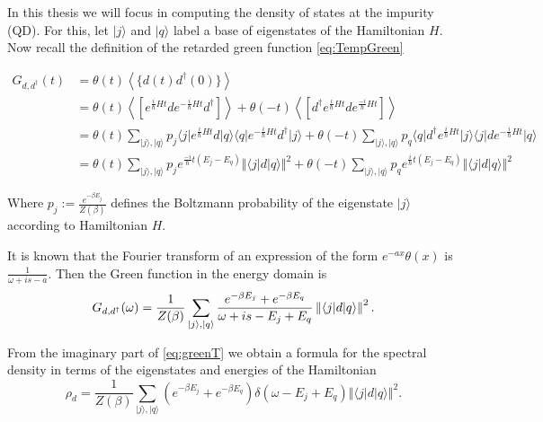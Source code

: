 
In this thesis we will focus in computing the density of states at the impurity (QD). For this, let $\vert j\rangle$ and $\vert q \rangle$ label a base of eigenstates of the Hamiltonian $H$. Now recall the definition of the retarded green function \eqref{eq:TempGreen}

\begin{align}
G_{d,d^{\dagger}}(t)&=\theta(t)\left\langle \{ d(t)d^{\dagger}(0) \} \right\rangle \\ \label{eq:MeanGreen}
&=\theta(t)\left\langle \left[e^{\frac{i}{\hbar}Ht}de^{-\frac{i}{\hbar}Ht}d^{\dagger}\right]\right\rangle +\theta(-t)\left\langle \left[d^{\dagger}e^{\frac{i}{\hbar}Ht}de^{\frac{-i}{\hbar}Ht}\right]\right\rangle \\
&=\theta(t)\sum_{\vert j\rangle,\vert q\rangle}p_{j}\langle j\vert e^{\frac{i}{\hbar}Ht}d\vert q\rangle\langle q\vert e^{-\frac{i}{\hbar}Ht}d^{\dagger}\vert j\rangle+\theta(-t)\sum_{\vert j\rangle,\vert q\rangle}p_{q}\langle q\vert d^{\dagger}e^{\frac{i}{\hbar}Ht}\vert j\rangle\langle j\vert de^{-\frac{i}{\hbar}Ht}\vert q\rangle\\
&=\theta(t)\sum_{\vert j\rangle,\vert q\rangle}p_{j}e^{\frac{-i}{\hbar}t\left(E_{j}-E_{q}\right)}\left\Vert \langle j\vert d\vert q\rangle\right\Vert ^{2}+\theta(-t)\sum_{\vert j\rangle,\vert q\rangle}p_{q}e^{\frac{i}{\hbar}t\left(E_{j}-E_{q}\right)}\left\Vert \langle j\vert d\vert q\rangle\right\Vert ^{2}
\end{align}

\noindent Where $p_{j}:=\frac{e^{-\beta E_{j}}}{Z(\beta)}$ defines the Boltzmann probability of the eigenstate $\vert j\rangle$ according to Hamiltonian $H$. 

It is known that the Fourier transform of an expression of the form ${\displaystyle e^{-ax}\theta(x)}$ is $\frac{1}{\omega+is-a}$. Then the Green function in the energy domain is 
\begin{equation}
G_{d,d^{\dagger}}(\omega)=\frac{1}{Z(\beta)}\sum_{\vert j\rangle,\vert q\rangle}{\displaystyle \frac{e^{-\beta E_{j}}+e^{-\beta E_{q}}}{\omega+is-E_{j}+E_{q}}}\left\Vert \langle j\vert d\vert q\rangle\right\Vert ^{2}
. \label{eq:greenT}
\end{equation}

\noindent From the imaginary part of \eqref{eq:greenT} we obtain a formula for the spectral density in terms of the eigenstates and energies of the Hamiltonian 
\begin{equation}
\rho_{d}=\frac{1}{Z(\beta)}\sum_{\vert j\rangle,\vert q\rangle}{\displaystyle \left(e^{-\beta E_{j}}+e^{-\beta E_{q}} \right) \delta\left(\omega-E_{j}+E_{q} \right) } \left\Vert \langle j\vert d\vert q\rangle \right\Vert^{2}. \label{eq:DOSeigenstates}
\end{equation}


